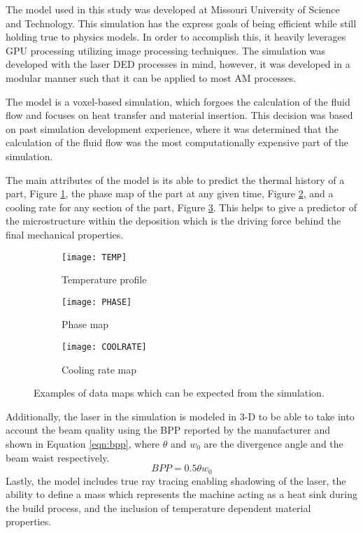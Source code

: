 \label{model_description}

The model used in this study was developed at Missouri University of Science and Technology.
This simulation has the express goals of being efficient while still holding true to physics models.  In order to accomplish this, it heavily leverages GPU processing utilizing image processing techniques.  The simulation was developed with the laser \ac{DED} processes in mind, however, it was developed in a modular manner such that it can be applied to most \ac{AM} processes. 

The model is a voxel-based simulation, which forgoes the calculation of the fluid flow and focuses on heat transfer and material insertion.  This decision was based on past simulation development experience, where it was determined that the calculation of the fluid flow was the most computationally expensive part of the simulation.   

The main attributes of the model is its able to predict the thermal history of a part, Figure \ref{fig:TEMP}, the phase map of the part at any given time, Figure \ref{fig:PHASE}, and a cooling rate for any section of the part, Figure \ref{fig:COOLRATE}.  This helps to give a predictor of the microstructure within the deposition which is the driving force behind the final mechanical properties. 
\begin{figure}[!htb]\centering
    \begin{subfigure}[c]{0.3\textwidth}
	\centering
	\texttt{[image: TEMP]}
	\caption{Temperature profile}
	\label{fig:TEMP}
    \end{subfigure}
        \begin{subfigure}[c]{0.3\textwidth}
    	\centering
    	\texttt{[image: PHASE]}
    	\caption{Phase map}
    	\label{fig:PHASE}
        \end{subfigure}
            \begin{subfigure}[c]{0.3\textwidth}
            \centering
        	\texttt{[image: COOLRATE]}
        	\caption{Cooling rate map}
        	\label{fig:COOLRATE}
            \end{subfigure}
	\caption{Examples of data maps which can be expected from the simulation.}
	\label{fig:data_maps}	
\end{figure}
Additionally, the laser in the simulation is modeled in 3-D to be able to take into account the beam quality using the \ac{BPP} reported by the manufacturer and shown in Equation \ref{eqn:bpp}, where $\theta$ and $w_0$ are the divergence angle and the beam waist respectively.
\begin{equation}\label{eqn:bpp}
	BPP = 0.5 \theta w_0
\end{equation} 
Lastly, the model includes true ray tracing enabling shadowing of the laser, the ability to define a mass which represents the machine acting as a heat sink during the build process, and the inclusion of temperature dependent material properties.

